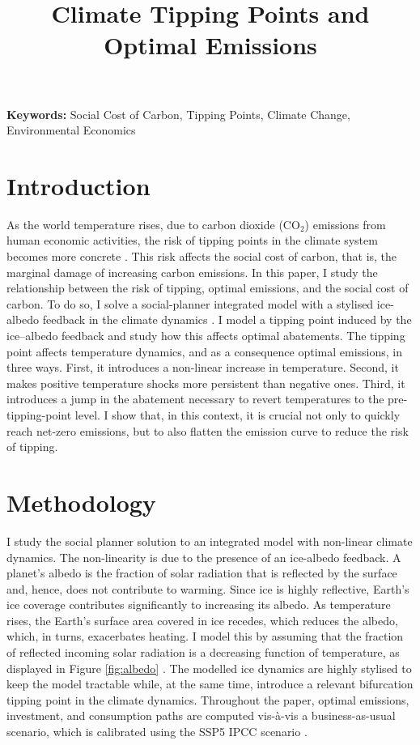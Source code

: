 \documentclass[12pt]{article}
\title{Climate Tipping Points and Optimal Emissions}
\author{} %
\date{} %
\begin{document}
\maketitle

\textbf{Keywords:} Social Cost of Carbon, Tipping Points, Climate Change, Environmental Economics

\section{Introduction}

As the world temperature rises, due to carbon dioxide (CO$_2$) emissions from human economic activities, the risk of tipping points in the climate system becomes more concrete \citep{ashwin_extreme_2020,sledd_cloudier_2021}. This risk affects the social cost of carbon, that is, the marginal damage of increasing carbon emissions. In this paper, I study the relationship between the risk of tipping, optimal emissions, and the social cost of carbon. To do so, I solve a social-planner integrated model with a stylised ice-albedo feedback in the climate dynamics \citep{hogg_glacial_2008,ashwin_tipping_2012}. I model a tipping point induced by the ice–albedo feedback and study how this affects optimal abatements. The tipping point affects temperature dynamics, and as a consequence optimal emissions, in three ways. First, it introduces a non-linear increase in temperature. Second, it makes positive temperature shocks more persistent than negative ones. Third, it introduces a jump in the abatement necessary to revert temperatures to the pre-tipping-point level. I show that, in this context, it is crucial not only to quickly reach net-zero emissions, but to also flatten the emission curve to reduce the risk of tipping.

\section{Methodology}

I study the social planner solution to an integrated model with non-linear climate dynamics. The non-linearity is due to the presence of an ice-albedo feedback. A planet's albedo is the fraction of solar radiation that is reflected by the surface and, hence, does not contribute to warming. Since ice is highly reflective, Earth's ice coverage contributes significantly to increasing its albedo. As temperature rises, the Earth's surface area covered in ice recedes, which reduces the albedo, which, in turns, exacerbates heating. I model this by assuming that the fraction of reflected incoming solar radiation is a decreasing function of temperature, as displayed in Figure \ref{fig:albedo} \citep{oerlemans_ice_1984, mendez_investigating_2021}. The modelled ice dynamics are highly stylised to keep the model tractable while, at the same time, introduce a relevant bifurcation tipping point in the climate dynamics. Throughout the paper, optimal emissions, investment, and consumption paths are computed vis-à-vis a business-as-usual scenario, which is calibrated using the SSP5 IPCC scenario \citep{kriegler_fossil-fueled_2017}.
\end{document}
